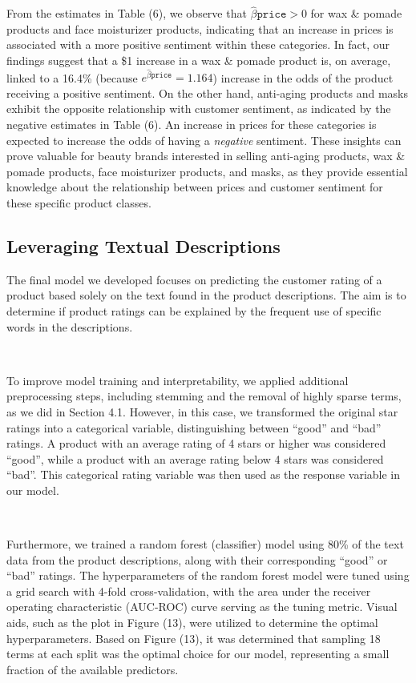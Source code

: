 \documentclass[10pt]{article}
\begin{document}
From the estimates in Table (6), we observe that $\hat{\beta}{\texttt{price}}>0$ for wax \& pomade products and face moisturizer products, indicating that an increase in prices is associated with a more positive sentiment within these categories. In fact, our findings suggest that a \$1 increase in a wax \& pomade product is, on average, linked to a 16.4\% (because $e^{\hat{\beta}{\texttt{price}}} = 1.164$) increase in the odds of the product receiving a positive sentiment. On the other hand, anti-aging products and masks exhibit the opposite relationship with customer sentiment, as indicated by the negative estimates in Table (6). An increase in prices for these categories is expected to increase the odds of having a \textit{negative} sentiment. These insights can prove valuable for beauty brands interested in selling anti-aging products, wax \& pomade products, face moisturizer products, and masks, as they provide essential knowledge about the relationship between prices and customer sentiment for these specific product classes.


\subsection{Leveraging Textual Descriptions}


The final model we developed focuses on predicting the customer rating of a product based solely on the text found in the product descriptions. The aim is to determine if product ratings can be explained by the frequent use of specific words in the descriptions.

\

To improve model training and interpretability, we applied additional preprocessing steps, including stemming and the removal of highly sparse terms, as we did in Section 4.1. However, in this case, we transformed the original star ratings into a categorical variable, distinguishing between ``good'' and ``bad'' ratings. A product with an average rating of 4 stars or higher was considered ``good'', while a product with an average rating below 4 stars was considered ``bad''. This categorical rating variable was then used as the response variable in our model.

\

Furthermore, we trained a random forest (classifier) model using 80\% of the text data from the product descriptions, along with their corresponding ``good'' or ``bad'' ratings. The hyperparameters of the random forest model were tuned using a grid search with 4-fold cross-validation, with the area under the receiver operating characteristic (AUC-ROC) curve serving as the tuning metric. Visual aids, such as the plot in Figure (13), were utilized to determine the optimal hyperparameters. Based on Figure (13), it was determined that sampling 18 terms at each split was the optimal choice for our model, representing a small fraction of the available predictors.
\end{document}
